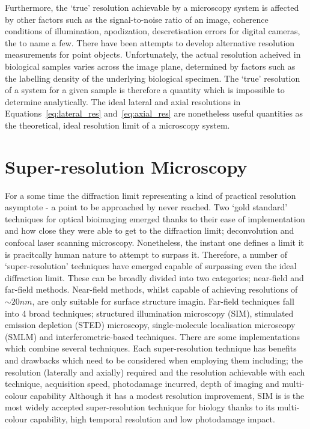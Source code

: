 Furthermore, the `true' resolution achievable by a microscopy system is affected 
by other factors such as the signal-to-noise ratio of an image, coherence 
conditions of illumination, apodization, descretisation errors for digital 
cameras, the to name a few\cite{den1997resolution}. There have been attempts to 
develop alternative resolution measurements for point objects\cite{ram2006beyond}. 
Unfortunately, the actual resolution acheived in biological samples varies 
across the image plane, determined by factors such as the labelling density of 
the underlying biological specimen\cite{culley2017nanoj}. The `true' resolution 
of a system for a given sample is therefore a quantity which is impossible to 
determine analytically. The ideal lateral and axial resolutions in 
Equations~\ref{eq:lateral_res} and~\ref{eq:axial_res} are nonetheless useful
quantities as the theoretical, ideal resolution limit of a microscopy system.

\section{Super-resolution Microscopy}
\label{sec:super_res}

For a some time the diffraction limit representing a kind of practical 
resolution asymptote - a point to be approached by never reached. Two
`gold standard' techniques for optical bioimaging emerged thanks to their
ease of implementation and how close they were able to get to the diffraction
limit; deconvolution\cite{agard1983three, wallace2001workingperson} and
confocal laser scanning microscopy\cite{sheppard1981theory,minsky1988memoir}. 
Nonetheless, the instant one defines a limit it is pracitcally human nature 
to attempt to surpass it. Therefore, a number of `super-resolution' techniques
have emerged capable of surpassing even the ideal diffraction limit. These
can be broadly divided into two categories; near-field and far-field methods.
Near-field methods, whilst capable of achieving resolutions of $\sim 20 nm$,
are only suitable for surface structure imagin\cite{schermelleh2010guide}. 
Far-field techniques fall into 4 broad techniques; structured illumination
microscopy (SIM), stimulated emission depletion (STED) microscopy, 
single-molecule localisation microscopy (SMLM) and interferometric-based 
techniques. There are some implementations which combine several 
techniques. Each super-resolution technique has benefits and drawbacks which 
need to be considered when employing them including; the resolution 
(laterally and axially) required and the resolution achievable with each 
technique, acquisition speed, photodamage incurred, depth of imaging and 
multi-colour capability\cite{hell20152015,schermelleh2019super} Although it 
has a modest resolution improvement, SIM is is the most widely accepted 
super-resolution technique for biology thanks to its multi-colour capability,
high temporal resolution and low photodamage impact\cite{leung2011review}.

